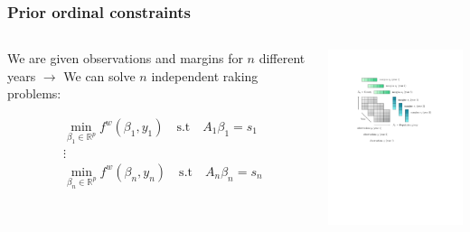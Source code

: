\documentclass[aspectratio=169]{beamer}
\begin{document}
\begin{frame}
	\frametitle{Prior ordinal constraints}
	\begin{columns}
	\begin{column}{.4\textwidth}
	We are given observations and margins for $n$ different years $\rightarrow$ We can solve $n$ independent raking problems:

	\vspace{2em}

	\begin{equation*}
	\begin{aligned}
	& \min_{\beta_1 \in \mathbb{R}^p} f^w \left( \beta_1 , y_1 \right) \quad \text{s.t} \quad A_1 \beta_1 = s_1 \\
	& \vdots \\
	& \min_{\beta_n \in \mathbb{R}^p} f^w \left( \beta_n , y_n \right) \quad \text{s.t} \quad A_n \beta_n = s_n
	\end{aligned}
	\end{equation*}
	\end{column}

	\begin{column}{.6\textwidth}
		\centering
		\includegraphics[width=8cm, trim={4.5cm 13cm 5cm 4.5cm},clip]{raking_2D_multiple.pdf}
	\end{column}
	\end{columns}
\end{frame}
\end{document}
